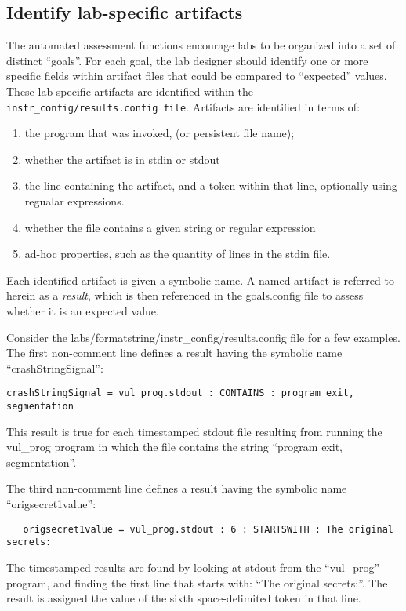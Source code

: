 \documentclass[12pt]{article}
\begin{document}
\subsection{Identify lab-specific artifacts}
\label{results.config}
The automated assessment functions encourage labs to be organized into a set of distinct ``goals''.
For each goal, the lab designer should identify one or more specific fields within artifact files that
could be compared to ``expected'' values.  These lab-specific artifacts are identified within the
\texttt{instr\_config/results.config file}.  Artifacts are identified in terms of:
\begin{enumerate}
\item the program that was invoked, (or persistent file name);
\item whether the artifact is in stdin or stdout
\item the line containing the artifact, and a token within that line, optionally using regualar expressions.
\item whether the file contains a given string or regular expression
\item ad-hoc properties, such as the quantity of lines in the stdin file.
\end{enumerate}

Each identified artifact is given a symbolic name. A named artifact is referred to herein as a \textit{result}, which 
is then referenced in the goals.config file to assess whether it is an expected value.

Consider the labs/formatstring/instr\_config/results.config file for a few examples.  
The first non-comment line defines a result having the symbolic name ``crashStringSignal'':
\begin{verbatim}
crashStringSignal = vul_prog.stdout : CONTAINS : program exit, segmentation
\end{verbatim}
\noindent This result is true for each timestamped stdout file resulting from running 
the vul\_prog program in which the file contains the string ``program exit, segmentation''.

The third non-comment line
defines a result having the symbolic name ``origsecret1value'':  
\begin{verbatim}
   origsecret1value = vul_prog.stdout : 6 : STARTSWITH : The original secrets:
\end{verbatim}
\noindent The timestamped results are
found by looking at stdout from the ``vul\_prog'' program, and finding the first line that starts with:
``The original secrets:''.  The result is assigned the value of the sixth space-delimited 
token in that line.
\end{document}
